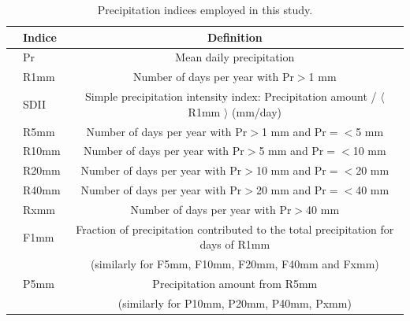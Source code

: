 \documentclass{ametsoc}
\begin{document}
\begin{table}
\begin{center}
\caption{Precipitation indices employed in this study.} \label{tab:table1}
\begin{tabular*}{5.0in}{l @{\extracolsep{\fill}}lc}
\hline \textbf{} & \textbf{Indice} & \textbf{Definition} \\
\hline & Pr & Mean daily precipitation \\
\hline & R1mm & Number of days per year with Pr$>$1 mm\\
\hline & SDII & Simple precipitation intensity index: Precipitation amount / $\langle$ R1mm $\rangle$ (mm/day) \\
\hline & R5mm & Number of days per year with Pr$>$1 mm and Pr$=<$5 mm\\
\hline & R10mm & Number of days per year with Pr$>$5 mm and Pr$=<$10 mm\\
\hline & R20mm & Number of days per year with Pr$>$10 mm and Pr$=<$20 mm\\
\hline & R40mm & Number of days per year with Pr$>$20 mm and Pr$=<$40 mm\\
\hline & Rxmm & Number of days per year with Pr$>$40 mm\\
\hline & F1mm & Fraction of precipitation contributed to the total precipitation for days of R1mm\\ 
 & & (similarly for F5mm, F10mm, F20mm,  F40mm and Fxmm) \\
\hline & P5mm & Precipitation amount from R5mm \\
 & & (similarly for P10mm, P20mm, P40mm,  Pxmm) \\
\hline 
\end{tabular*}
\end{center}
\end{table}


\clearpage

\end{document}
